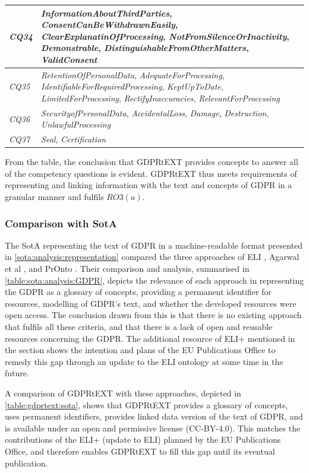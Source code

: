 \begin{table}[htbp]
\begin{tabularx}{\textwidth}{|l|X|}
\textit{CQ34} & \textit{InformationAboutThirdParties}, \textit{ConsentCanBeWithdrawnEasily}, \textit{ClearExplanatinOfProcessing}, \textit{NotFromSilenceOrInactivity}, \textit{Demonstrable}, \textit{DistinguishableFromOtherMatters}, \textit{ValidConsent} \\ \hline
\textit{CQ35} & \textit{RetentionOfPersonalData}, \textit{AdequateForProcessing}, \textit{IdentifiableForRequiredProcessing}, \textit{KeptUpToDate}, \textit{LimitedForProcessing}, \textit{RectifyInaccuracies}, \textit{RelevantForProcessing} \\ \hline
\textit{CQ36} & \textit{SecurityofPersonalData}, \textit{AccidentalLoss}, \textit{Damage}, \textit{Destruction}, \textit{UnlawfulProcessing} \\ \hline
\textit{CQ37} & \textit{Seal}, \textit{Certification} \\ \hline

\end{tabularx}
\label{table:gdprtext:eval-cq}
\end{table}
From the table, the conclusion that GDPRtEXT provides concepts to answer all of the competency questions is evident. GDPRtEXT thus meets requirements of representing and linking information with the text and concepts of GDPR in a granular manner and fulfils $RO3(a)$.

\subsubsection{Comparison with SotA}
The SotA representing the text of GDPR in a machine-readable format presented in \autoref{sota:analysis:representation} compared the three approaches of ELI \cite{thomas_european_2019}, Agarwal et al \cite{agarwal_legislative_2018}, and PrOnto \cite{palmirani_pronto_2018,palmirani_pronto_2018-1}.
Their comparison and analysis, summarised in \autoref{table:sota:analysis:GDPR}, depicts the relevance of each approach in representing the GDPR as a glossary of concepts, providing a permanent identifier for resources, modelling of GDPR's text, and whether the developed resources were open access.
The conclusion drawn from this is that there is no existing approach that fulfils all these criteria, and that there is a lack of open and reusable resources concerning the GDPR. 
The additional resource of ELI+ mentioned in the section shows the intention and plans of the EU Publications Office to remedy this gap through an update to the ELI ontology at some time in the future.

A comparison of GDPRtEXT with these approaches, depicted in \autoref{table:gdprtext:sota}, shows that GDPRtEXT provides a glossary of concepts, uses permanent identifiers, provides linked data version of the text of GDPR, and is available under an open and permissive license (CC-BY-4.0).
This matches the contributions of the ELI+ (update to ELI) planned by the EU Publications Office, and therefore enables GDPRtEXT to fill this gap until its eventual publication.

